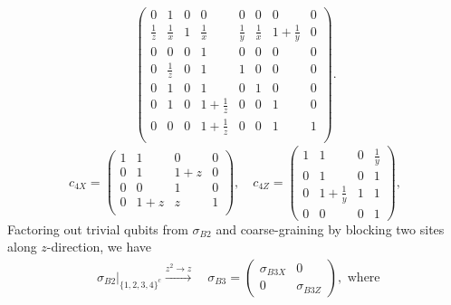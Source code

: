 {\begin{align*}
\begin{pmatrix}
 0 & 1 & 0 & 0 & 0 & 0 & 0 & 0 \\
 \frac{1}{z} & \frac{1}{x} & 1 & \frac{1}{x} & \frac{1}{y} & \frac{1}{x} & 1+\frac{1}{y} & 0 \\
 0 & 0 & 0 & 1 & 0 & 0 & 0 & 0 \\
 0 & \frac{1}{z} & 0 & 1 & 1 & 0 & 0 & 0 \\
 0 & 1 & 0 & 1 & 0 & 1 & 0 & 0 \\
 0 & 1 & 0 & 1+\frac{1}{z} & 0 & 0 & 1 & 0 \\
 0 & 0 & 0 & 1+\frac{1}{z} & 0 & 0 & 1 & 1 \\
\end{pmatrix}.
\end{align*}
\[
c_{4X} =
\begin{pmatrix}
 1 & 1 & 0 & 0   \\
 0 & 1 & 1+z & 0 \\
 0 & 0 & 1 & 0   \\
 0 & 1+z & z & 1 \\
\end{pmatrix},
\quad
c_{4Z} =
\begin{pmatrix}
1 & 1 & 0 & \frac{1}{y} \\
0 & 1 & 0 & 1 \\
0 & 1+\frac{1}{y} & 1 & 1 \\
0 & 0 & 0 & 1
\end{pmatrix},
\]
}%
Factoring out trivial qubits from $\sigma_{B2}$ and coarse-graining by blocking two sites along $z$-direction,
we have
\begin{align*}
& \sigma_{B2}|_{\{1,2,3,4\}^c} \xrightarrow{z^2 \to z} \quad 
\sigma_{B3} = \begin{pmatrix} \sigma_{B3X} & 0 \\ 0 & \sigma_{B3Z} \end{pmatrix}, \text{ where }
\end{align*}
